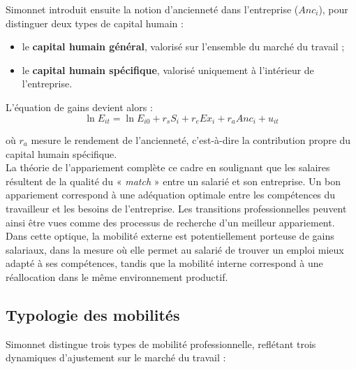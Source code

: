 \documentclass[12pt,a4paper]{article}
\begin{document}
Simonnet introduit ensuite la notion d’ancienneté dans l’entreprise ($Anc_i$), pour distinguer deux types de capital humain :
\begin{itemize}
    \item le \textbf{capital humain général}, valorisé sur l’ensemble du marché du travail ;
    \item le \textbf{capital humain spécifique}, valorisé uniquement à l’intérieur de l’entreprise.
\end{itemize}

L’équation de gains devient alors :
\begin{equation}
\ln E_{it} = \ln E_{i0} + r_s S_i + r_e Ex_i + r_a Anc_i + u_{it}
\end{equation}

où $r_a$ mesure le rendement de l’ancienneté, c’est-à-dire la contribution propre du capital humain spécifique.\\
La théorie de l’appariement complète ce cadre en soulignant que les salaires résultent de la qualité du « \textit{match} » entre un salarié et son entreprise.  
Un bon appariement correspond à une adéquation optimale entre les compétences du travailleur et les besoins de l’entreprise.  
Les transitions professionnelles peuvent ainsi être vues comme des processus de recherche d’un meilleur appariement.  
Dans cette optique, la mobilité externe est potentiellement porteuse de gains salariaux, dans la mesure où elle permet au salarié de trouver un emploi mieux adapté à ses compétences, tandis que la mobilité interne correspond à une réallocation dans le même environnement productif.

\subsection{Typologie des mobilités}

Simonnet distingue trois types de mobilité professionnelle, reflétant trois dynamiques d’ajustement sur le marché du travail :
\end{document}
